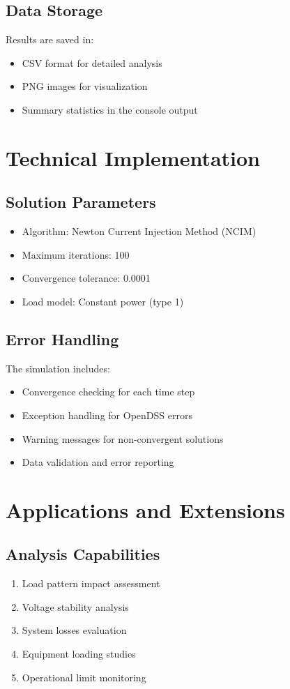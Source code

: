 \documentclass[11pt]{article}
\begin{document}
\subsection{Data Storage}
Results are saved in:
\begin{itemize}
    \item CSV format for detailed analysis
    \item PNG images for visualization
    \item Summary statistics in the console output
\end{itemize}

\section{Technical Implementation}

\subsection{Solution Parameters}
\begin{itemize}
    \item Algorithm: Newton Current Injection Method (NCIM)
    \item Maximum iterations: 100
    \item Convergence tolerance: 0.0001
    \item Load model: Constant power (type 1)
\end{itemize}

\subsection{Error Handling}
The simulation includes:
\begin{itemize}
    \item Convergence checking for each time step
    \item Exception handling for OpenDSS errors
    \item Warning messages for non-convergent solutions
    \item Data validation and error reporting
\end{itemize}

\section{Applications and Extensions}

\subsection{Analysis Capabilities}
\begin{enumerate}
    \item Load pattern impact assessment
    \item Voltage stability analysis
    \item System losses evaluation
    \item Equipment loading studies
    \item Operational limit monitoring
\end{enumerate}
\end{document}
